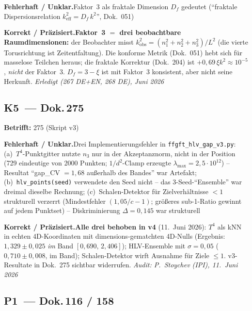 \smallskip\noindent\textbf{Fehlerhaft / Unklar.}\quad Faktor~3 als fraktale Dimension $D_f$ gedeutet (\enquote{fraktale Dispersionsrelation $k^2_\mathrm{eff}=D_f\,k^2$}, Dok.~051)


\smallskip\noindent\textbf{Korrekt / Präzisiert.}\quad \textbf{Faktor~3 $=$ drei beobachtbare Raumdimensionen:} der Beobachter misst $k_\mathrm{obs}^2=(n_1^2+n_2^2+n_3^2)/L^2$ (die vierte Torusrichtung ist Zeitentfaltung). Die konforme Metrik (Dok.~051) hebt sich für masselose Teilchen heraus; die fraktale Korrektur (Dok.~204) ist $+0{,}69\,\xi k^2\approx10^{-5}$, \emph{nicht} der Faktor~3. $D_f=3-\xi$ ist mit Faktor~3 konsistent, aber nicht seine Herkunft. \emph{Erledigt (267 DE+EN, 268 DE), Juni 2026}


\medskip


\subsection*{K5~--- Dok.\,275}

\noindent\textbf{Betrifft:} 275 (Skript v3)


\smallskip\noindent\textbf{Fehlerhaft / Unklar.}\quad Drei Implementierungsfehler in \texttt{ffgft\_hlv\_gap\_v3.py}:
  (a)~$T^4$-Punktgitter nutzte $n_3$ nur in der Akzeptanznorm, nicht in
  der Position (729 eindeutige von 2000 Punkten; $1/d^2$-Clamp erzeugte
  $\lambda_\mathrm{max}=2{,}5{\cdot}10^{12}$) -- Resultat
  \enquote{gap\_CV $=1{,}68$ außerhalb des Bandes} war Artefakt;
  (b)~\texttt{hlv\_points(seed)} verwendete den Seed nicht -- das
  3-Seed-\enquote{Ensemble} war dreimal dieselbe Rechnung;
  (c)~Schalen-Detektor für Zielverhältnisse $<1$ strukturell verzerrt
  (Mindestfehler $(1{,}05/c-1)$; größeres sub-1-Ratio gewinnt auf jedem
  Punktset) -- Diskriminierung $\Delta=0{,}145$ war strukturell


\smallskip\noindent\textbf{Korrekt / Präzisiert.}\quad \textbf{Alle drei behoben in v4} (11.~Juni 2026): $T^4$ als kNN in
  echten 4D-Koordinaten mit dimensions-gematchten 4D-Nulls (Ergebnis:
  $1{,}329\pm0{,}025$ \emph{im} Band $[0{,}690,\,2{,}406]$);
  HLV-Ensemble mit $\sigma=0{,}05$ ($0{,}710\pm0{,}008$, im Band);
  Schalen-Detektor wirft Ausnahme für Ziele $\leq1$.
  v3-Resultate in Dok.~275 sichtbar widerrufen.
  \emph{Audit: P.~Stoychev (IPI), 11.~Juni 2026}


\medskip


\subsection*{P1~--- Dok.\,116 / 158}

